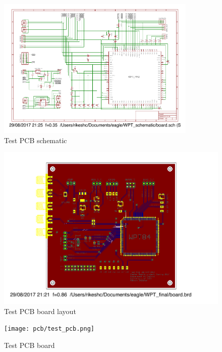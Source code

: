 \documentclass[12pt,a4paper,UKenglish]{report}
\makeatletter
\newcommand\backmatter{%
  \if@openright
    \cleardoublepage
  \else
    \clearpage
  \fi
}
\makeatother
\begin{document}
\begin{appendices}
\begin{figure} [!htbp]	%
 	\centering
  	\includegraphics[width=0.85\textwidth]{appendix/pcb_schematic.pdf} 
 	\caption{Test PCB schematic} 
	\label{fig:appen_schemtic_pcb} 
\end{figure}


\begin{figure} [!htbp]
 	\centering
  	\includegraphics[width=\textwidth]{appendix/pcb_board.pdf} 
 	\caption{Test PCB board layout} 
	\label{fig:appen_board_pcb_layout} 
\end{figure}

\begin{figure} [!htbp] 	%
 	\centering
  	\texttt{[image: pcb/test\_pcb.png]} 
 	\caption{Test PCB board} 
	\label{fig:appen_board_pcb} 
\end{figure}

\end{appendices} %


\backmatter{}	%

\cleardoublepage
{}
{}
\nocite{*}
\printbibliography

\cleardoublepage
{}
{}
\printnoidxglossaries
\end{document}
